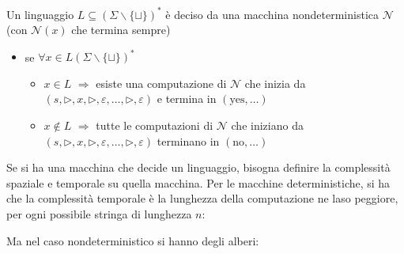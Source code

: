 \begin{definition}
    Un lin\-guag\-gio $L\subseteq(\Sigma\backslash\{\sqcup\})^*$ è deciso da una macchina nondeterministica $\mathcal{N}$ (con $\mathcal{N}(x)$ che termina sempre)
    \begin{itemize}
        \item[] se $\forall x\in L(\Sigma\backslash\{\sqcup\})^*$
        \begin{itemize}
            \item $x\in L$ $\Rightarrow$ esiste una computazione di $\mathcal{N}$ che inizia da $(s,\rhd,x,\rhd,\varepsilon,\dots,\rhd,\varepsilon)$ e termina in $(\text{yes},\dots)$
            \item $x\notin L$ $\Rightarrow$ tutte le computazioni di $\mathcal{N}$ che iniziano da $(s,\rhd,x,\rhd,\varepsilon,\dots,\rhd,\varepsilon)$ terminano in $(\text{no},\dots)$
        \end{itemize}
    \end{itemize}
\end{definition}
Se si ha una macchina che decide un linguaggio, bisogna definire la complessità spaziale e temporale su quella macchina. Per le macchine deterministiche, si ha che la complessità temporale è la lunghezza della computazione ne laso peggiore, per ogni possibile stringa di lunghezza $n$:
\begin{center}
\end{center}
Ma nel caso nondeterministico si hanno degli alberi:
